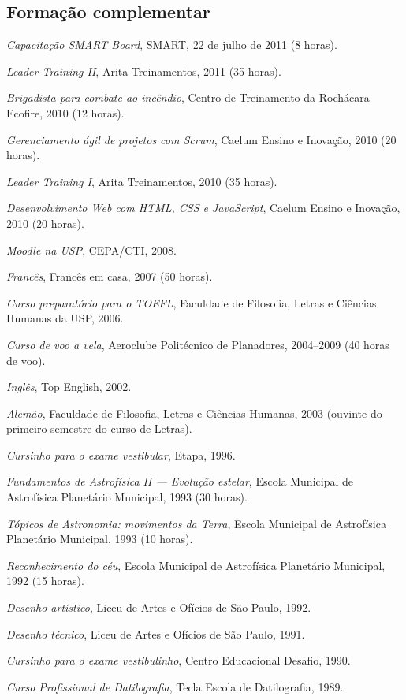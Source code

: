 \subsection{Formação complementar}

\begin{compactitem}
  \item \textsl{Capacitação SMART Board}, SMART, 22 de julho de 2011 (8 horas).
  \item \textsl{Leader Training II}, Arita Treinamentos, 2011 (35 horas).
  \item \textsl{Brigadista para combate ao incêndio}, Centro de Treinamento da Rochácara Ecofire, 2010 (12 horas).
  \item \textsl{Gerenciamento ágil de projetos com Scrum}, Caelum Ensino e Inovação, 2010 (20 horas).
  \item \textsl{Leader Training I}, Arita Treinamentos, 2010 (35 horas).
  \item \textsl{Desenvolvimento Web com HTML, CSS e JavaScript}, Caelum Ensino e Inovação, 2010 (20 horas).
  \item \textsl{Moodle na USP}, CEPA/CTI, 2008.
  \item \textsl{Francês}, Francês em casa, 2007 (50 horas).
  \item \textsl{Curso preparatório para o TOEFL}, Faculdade de Filosofia, Letras e Ciências Humanas da USP, 2006.
  \item \textsl{Curso de voo a vela}, Aeroclube Politécnico de Planadores, 2004--2009 (40 horas de voo).
  \item \textsl{Inglês}, Top English, 2002.
  \item \textsl{Alemão}, Faculdade de Filosofia, Letras e Ciências Humanas, 2003 (ouvinte do primeiro semestre do curso de Letras).
  \item \textsl{Cursinho para o exame vestibular}, Etapa, 1996.
  \item \textsl{Fundamentos de Astrofísica II --- Evolução estelar}, Escola Municipal de Astrofísica Planetário Municipal, 1993 (30 horas).
  \item \textsl{Tópicos de Astronomia: movimentos da Terra}, Escola Municipal de Astrofísica Planetário Municipal, 1993 (10 horas).
  \item \textsl{Reconhecimento do céu}, Escola Municipal de Astrofísica Planetário Municipal, 1992 (15 horas).
  \item \textsl{Desenho artístico}, Liceu de Artes e Ofícios de São Paulo, 1992.
  \item \textsl{Desenho técnico}, Liceu de Artes e Ofícios de São Paulo, 1991.
  \item \textsl{Cursinho para o exame vestibulinho}, Centro Educacional Desafio, 1990.
  \item \textsl{Curso Profissional de Datilografia}, Tecla Escola de Datilografia, 1989.
\end{compactitem}

